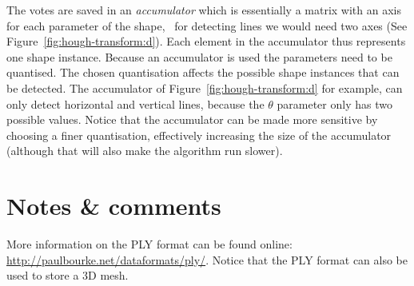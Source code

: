 The votes are saved in an \emph{accumulator} which is essentially a matrix with an axis for each parameter of the shape, \eg\ for detecting lines we would need two axes (See Figure~\ref{fig:hough-transform:d}).
Each element in the accumulator thus represents one shape instance.
Because an accumulator is used the parameters need to be quantised.
The chosen quantisation affects the possible shape instances that can be detected.
The accumulator of Figure~\ref{fig:hough-transform:d} for example, can only detect horizontal and vertical lines, because the $\theta$ parameter only has two possible values.
Notice that the accumulator can be made more sensitive by choosing a finer quantisation, effectively increasing the size of the accumulator (although that will also make the algorithm run slower).


%
%
%
%
%


%
\section{Notes \& comments}
More information on the PLY format can be found online: \url{http://paulbourke.net/dataformats/ply/}. 
Notice that the PLY format can also be used to store a 3D mesh.

